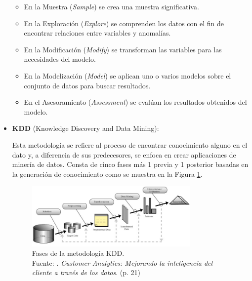 \begin{itemize}
	\begin{itemize}
		\item En la Muestra (\textit{Sample}) se crea una muestra significativa.
		\item En la Exploración (\textit{Explore}) se comprenden los datos con el fin de encontrar relaciones entre variables y anomalías.
		\item En la Modificación (\textit{Modify}) se transforman las variables para las necesidades del modelo.
		\item En la Modelización (\textit{Model}) se aplican uno o varios modelos sobre el conjunto de datos para buscar resultados.
		\item En el Asesoramiento (\textit{Assessment}) se evalúan los resultados obtenidos del modelo.
	\end{itemize}
	
	\item \textbf{KDD} (Knowledge Discovery and Data Mining):
	
	Esta metodología se refiere al proceso de encontrar conocimiento alguno en el dato y, a diferencia de sus predecesores, se enfoca en crear aplicaciones de minería de datos. Consta de cinco fases más 1 previa y 1 posterior basadas en la generación de conocimiento como se muestra en la Figura \ref{2:fig11}.
	\begin{figure}[h]
		\begin{center}
			\includegraphics[width=0.80\textwidth]{2/figures/kdd.jpg}
			\caption[Fases de la metodología KDD]{Fases de la metodología KDD.\\
			Fuente: \cite{tec_braulio2015metodologiasdm}. \textit{Customer Analytics: Mejorando la inteligencia del cliente a través de los datos}. (p. 21)}
			\label{2:fig11}
		\end{center}
	\end{figure}
	

\end{itemize}
